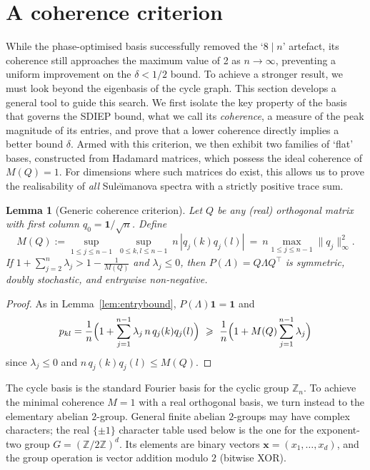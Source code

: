 \documentclass[12pt,fleqn]{amsart}
\renewcommand{\le}{\leqslant}
\renewcommand{\ge}{\geqslant}
\newtheorem{lem}[thm]{Lemma}
\theoremstyle{definition}
\theoremstyle{remark}
\newcommand{\1}{\mathbf{1}}
\newcommand{\Lam}{\Lambda}
\begin{document}
\section{A coherence criterion}\label{sec:coherence}

While the phase-optimised basis successfully removed the `$8 \mid n$' artefact, its coherence still approaches the maximum value of 2 as $n \to \infty$, preventing a uniform improvement on the $\delta < 1/2$ bound. To achieve a stronger result, we must look beyond the eigenbasis of the cycle graph. This section develops a general tool to guide this search. We first isolate the key property of the basis that governs the SDIEP bound, what we call its \emph{coherence}, a measure of the peak magnitude of its entries, and prove that a lower coherence directly implies a better bound $\delta$. Armed with this criterion, we then exhibit two families of `flat' bases, constructed from Hadamard matrices, which possess the ideal coherence of $M(Q)=1$. For dimensions where such matrices do exist, this allows us to prove the realisability of \emph{all} Sule\u{\i}manova spectra with a strictly positive trace sum.

\begin{lem}[Generic coherence criterion]\label{lem:coh}
Let $Q$ be any (real) orthogonal matrix with first column $q_0=\1/\sqrt n$. Define
\[
M(Q):=\sup_{1\le j\le n-1}\ \sup_{0\le k,l\le n-1}\ n\,|q_j(k)q_j(l)|
\ =\ n\max_{1\le j\le n-1}\|q_j\|_\infty^2.
\]
If $1+\sum_{j=2}^n\lambda_j>1-\tfrac1{M(Q)}$ and $\lambda_j\le0$, then $P(\Lam)=Q\Lam Q^\top$ is \emph{symmetric, doubly stochastic, and entrywise non-negative}.
\end{lem}


\begin{proof}
As in Lemma~\ref{lem:entrybound}, $P(\Lam)\1=\1$ and
\[
p_{kl}=\frac1n\Bigl(1+\sum_{j=1}^{n-1}\lambda_j\,n\,q_j(k)q_j(l)\Bigr)
\ \ge\ \frac1n\Bigl(1+M(Q)\sum_{j=1}^{n-1}\lambda_j\Bigr)
\]
since $\lambda_j\le0$ and $n\,q_j(k)q_j(l)\le M(Q)$.
\end{proof}

The cycle basis is the standard Fourier basis for the cyclic group $\mathbb{Z}_n$. To achieve the minimal coherence $M=1$ with a real orthogonal basis, we turn instead to the elementary abelian $2$-group. General finite abelian $2$-groups may have complex characters; the real $\{\pm1\}$ character table used below is the one for the exponent-two group $G=(\mathbb{Z}/2\mathbb{Z})^d$. Its elements are binary vectors $\mathbf{x}=(x_1,\dots,x_d)$, and the group operation is vector addition modulo $2$ (bitwise XOR).
\end{document}
